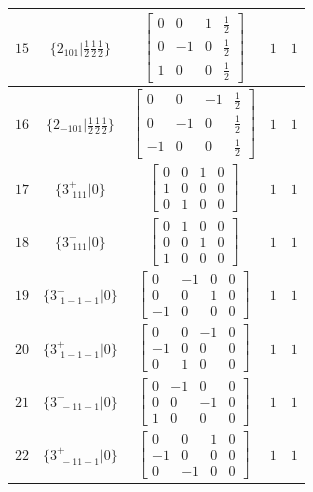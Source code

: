 \documentclass[fleqn,8pt]{jsarticle}
\begin{document}
\begin{longtable}{ccccc}
$ 15 $ & $ \{2{}_{101}|\frac{1}{2} \frac{1}{2} \frac{1}{2}\} $ & $ \begin{bmatrix} 0 & 0 & 1 & \frac{1}{2} \\ 0 & -1 & 0 & \frac{1}{2} \\ 1 & 0 & 0 & \frac{1}{2} \end{bmatrix} $ & $ 1 $ & $ 1 $ \\ \hline
$ 16 $ & $ \{2{}_{-101}|\frac{1}{2} \frac{1}{2} \frac{1}{2}\} $ & $ \begin{bmatrix} 0 & 0 & -1 & \frac{1}{2} \\ 0 & -1 & 0 & \frac{1}{2} \\ -1 & 0 & 0 & \frac{1}{2} \end{bmatrix} $ & $ 1 $ & $ 1 $ \\ \hline
$ 17 $ & $ \{3^{+}_{\,\,111}|0\} $ & $ \begin{bmatrix} 0 & 0 & 1 & 0 \\ 1 & 0 & 0 & 0 \\ 0 & 1 & 0 & 0 \end{bmatrix} $ & $ 1 $ & $ 1 $ \\ \hline
$ 18 $ & $ \{3^{-}_{\,\,111}|0\} $ & $ \begin{bmatrix} 0 & 1 & 0 & 0 \\ 0 & 0 & 1 & 0 \\ 1 & 0 & 0 & 0 \end{bmatrix} $ & $ 1 $ & $ 1 $ \\ \hline
$ 19 $ & $ \{3^{-}_{\,\,1-1-1}|0\} $ & $ \begin{bmatrix} 0 & -1 & 0 & 0 \\ 0 & 0 & 1 & 0 \\ -1 & 0 & 0 & 0 \end{bmatrix} $ & $ 1 $ & $ 1 $ \\ \hline
$ 20 $ & $ \{3^{+}_{\,\,1-1-1}|0\} $ & $ \begin{bmatrix} 0 & 0 & -1 & 0 \\ -1 & 0 & 0 & 0 \\ 0 & 1 & 0 & 0 \end{bmatrix} $ & $ 1 $ & $ 1 $ \\ \hline
$ 21 $ & $ \{3^{-}_{\,\,-11-1}|0\} $ & $ \begin{bmatrix} 0 & -1 & 0 & 0 \\ 0 & 0 & -1 & 0 \\ 1 & 0 & 0 & 0 \end{bmatrix} $ & $ 1 $ & $ 1 $ \\ \hline
$ 22 $ & $ \{3^{+}_{\,\,-11-1}|0\} $ & $ \begin{bmatrix} 0 & 0 & 1 & 0 \\ -1 & 0 & 0 & 0 \\ 0 & -1 & 0 & 0 \end{bmatrix} $ & $ 1 $ & $ 1 $ \\ \hline

\end{longtable}
\end{document}
